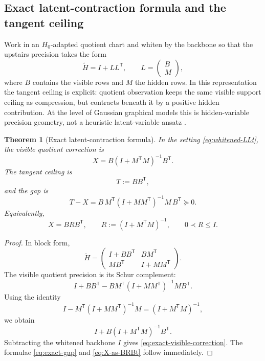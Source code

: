 \documentclass[11pt]{article}
\numberwithin{equation}{section}
\theoremstyle{thmcompact}
\newtheorem{theorem}{Theorem}[section]
\theoremstyle{remark}
\begin{document}
\subsection{Exact latent-contraction formula and the tangent ceiling}

Work in an $H_0$-adapted quotient chart and whiten by the backbone so that the upstairs precision takes the form
\begin{equation}\label{eq:whitened-LLt}
\widetilde H = I + L L^{\mathsf T},
\qquad
L=
\begin{pmatrix}
B\\
M
\end{pmatrix},
\end{equation}
where $B$ contains the visible rows and $M$ the hidden rows. In this representation the tangent ceiling is explicit: quotient observation keeps the same visible support ceiling as compression, but contracts beneath it by a positive hidden contribution. At the level of Gaussian graphical models this is hidden-variable precision geometry, not a heuristic latent-variable ansatz \cite{Dempster1972,Lauritzen1996,ChandrasekaranParriloWillsky2012}.

\begin{theorem}[Exact latent-contraction formula]\label{thm:latent-contraction}
In the setting \eqref{eq:whitened-LLt}, the visible quotient correction is
\begin{equation}\label{eq:exact-visible-correction}
X = B(I+M^{\mathsf T} M)^{-1} B^{\mathsf T}.
\end{equation}
The tangent ceiling is
\begin{equation}\label{eq:tangent-ceiling}
T:=BB^{\mathsf T},
\end{equation}
and the gap is
\begin{equation}\label{eq:exact-gap}
T-X = B\,M^{\mathsf T}(I+MM^{\mathsf T})^{-1}M\,B^{\mathsf T} \succeq 0.
\end{equation}
Equivalently,
\begin{equation}\label{eq:X-as-BRBt}
X = B R B^{\mathsf T},
\qquad
R:=(I+M^{\mathsf T} M)^{-1},
\qquad 0\prec R\le I.
\end{equation}
\end{theorem}

\begin{proof}
In block form,
\[
\widetilde H=
\begin{pmatrix}
I+BB^{\mathsf T} & BM^{\mathsf T}\\
MB^{\mathsf T} & I+MM^{\mathsf T}
\end{pmatrix}.
\]
The visible quotient precision is its Schur complement:
\[
I+BB^{\mathsf T} - BM^{\mathsf T}(I+MM^{\mathsf T})^{-1}MB^{\mathsf T}.
\]
Using the identity
\[
I - M^{\mathsf T}(I+MM^{\mathsf T})^{-1}M = (I+M^{\mathsf T}M)^{-1},
\]
we obtain
\[
I + B(I+M^{\mathsf T}M)^{-1}B^{\mathsf T}.
\]
Subtracting the whitened backbone $I$ gives \eqref{eq:exact-visible-correction}. The formulae \eqref{eq:exact-gap} and \eqref{eq:X-as-BRBt} follow immediately.
\end{proof}
\end{document}
